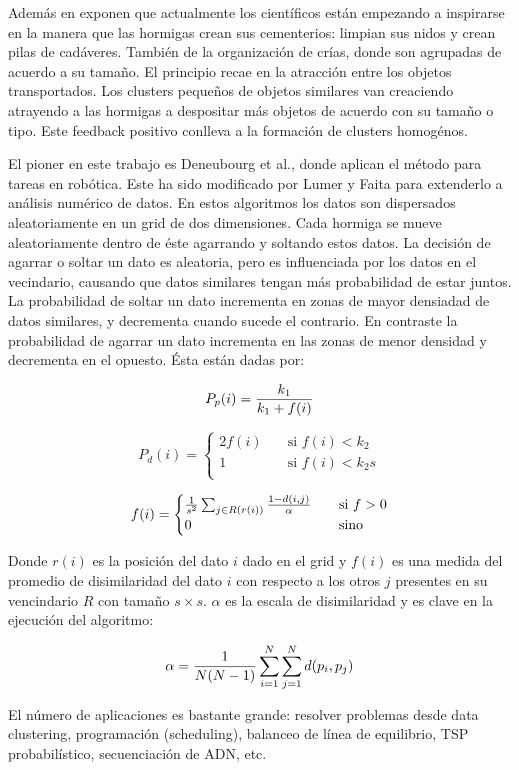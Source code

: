 Adem\'as en \cite{OuBa2007} exponen que actualmente los cient\'ificos est\'an 
empezando a inspirarse en la manera que las hormigas crean sus cementerios: limpian sus nidos
y crean pilas de cad\'averes. 
Tambi\'en de la organizaci\'on de cr\'ias, donde son agrupadas
de acuerdo a su tama\~no. El principio recae en la atracci\'on
entre los objetos transportados. Los clusters pequeños de objetos
similares van creaciendo atrayendo a las hormigas a despositar m\'as
objetos de acuerdo con su tama\~no o tipo. Este feedback positivo
conlleva a la formaci\'on de clusters homog\'enos.

El pioner en este trabajo es Deneubourg et al., donde aplican el
m\'etodo para tareas en rob\'otica. Este ha sido modificado por Lumer
y Faita para extenderlo a an\'alisis num\'erico de datos.
En estos algoritmos los datos son dispersados aleatoriamente
en un grid de dos dimensiones. Cada hormiga se mueve aleatoriamente
dentro de \'este agarrando y soltando estos datos. La decisi\'on
de agarrar o soltar un dato es aleatoria,
pero es influenciada por los datos en el vecindario, 
causando que datos similares tengan m\'as probabilidad de
estar juntos. La probabilidad de soltar un dato incrementa
en zonas de mayor densiadad de datos similares, y decrementa
cuando sucede el contrario.  En contraste
la probabilidad de agarrar un dato incrementa en las zonas de
menor densidad y decrementa en el opuesto.
\'Esta est\'an dadas por:

\[
P_p(i) = {k_1 \over {k_1 + f(i)}}
\]

\[
P_d(i) = 
  \begin{cases}
    2f(i) & \quad \text{si $f(i)<k_2$}\\
    1     & \quad \text{si $f(i) < k_2s$}\\
  \end{cases}
\]

\[
f(i) =
  \begin{cases}
    {{1} \over {s^2}} \sum_{j \in R(r(i))} {{1 - {d(i,j)}} \over \alpha} & \quad \text{si $f > 0$}\\
    0     & \quad \text{sino}
  \end{cases} 
\]

Donde $r(i)$ es la posici\'on del dato $i$ dado en el grid y $f(i)$ es una medida
del promedio de disimilaridad del dato $i$ con respecto a los otros $j$
presentes en su vencindario $R$ con tama\~no $s \times s$. $\alpha$
es la escala de disimilaridad y es clave en la ejecuci\'on del algoritmo:

\[
\alpha = {{1 \over {N(N-1)}} \sum_{i=1}^N \sum_{j=1}^N d(p_i,p_j)}
\]

El n\'umero de aplicaciones es bastante grande: resolver problemas
desde data clustering, programaci\'on (scheduling), balanceo
de l\'inea de equilibrio, TSP probabil\'istico, secuenciaci\'on de 
ADN, etc. \cite{GePo2010}
